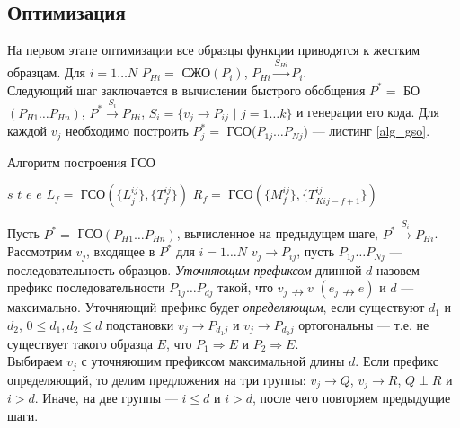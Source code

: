 \documentclass[12pt]{article}
\begin{document}
\subsection[Оптимизация]{\large Оптимизация}
\hspace{\parindent} На первом этапе оптимизации все образцы функции приводятся к жестким образцам. Для $i = 1 \ldots N$ $P_{Hi} = $ СЖО$(P_i)$, $P_{Hi} \xrightarrow{S_{Hi}} P_i$.\\
\indent Следующий шаг заключается в вычислении быстрого обобщения $P^{*} = $ БО$(P_{H1} \ldots P_{Hn})$, $P^{*} \xrightarrow{S_i} P_{Hi}$, $S_i = \{v_j \to P_{ij}$ $|$ $j = 1\ldots k \}$ и генерации его кода. Для каждой $v_j$ необходимо построить $P_j^* = $ ГСО($P_{1j} \ldots P_{Nj}$) --- листинг \ref{alg_gso}.
 
\begin{algorithm}[H]
\caption{Алгоритм построения ГСО}\label{alg_gso}
\begin{algorithmic}[1]
		\State \Return $s$
	\EndIf
		\State \Return $t$
	\EndIf
		\State {}
		\State {}
		\State {}
		\State {}		
			\State \Return $e$
		\EndIf
			\State \Return $e$
		\EndIf
		\State $L_f = $ ГСО$(\{L_j^{ij}\}, \{T_f^{ij}\})$
		\State $R_f = $ ГСО$(\{M_f^{ij}\}, \{T_{Kij-f+1}^{ij}\})$	
		\State {} 	
	\EndIf
\EndFunction
\end{algorithmic}
\end{algorithm}

\indent Пусть $P^{*} = $ ГСО$(P_{H1} \ldots P_{Hn})$, вычисленное на предыдущем шаге, $P^{*} \xrightarrow{S_i} P_{Hi}$. Рассмотрим $v_j$, входящее в $P^*$ для $i = 1 \ldots N$ $v_j \to P_{ij}$, пусть $P_{1j} \ldots P_{Nj}$ --- последовательность образцов. \textit{Уточняющим префиксом} длинной $d$ назовем префикс последовательности $P_{1j} \ldots P_{dj}$ такой, что $v_j \nrightarrow v$ $(e_j \nrightarrow e)$ и $d$ --- максимально. Уточняющий префикс будет \textit{определяющим}, если существуют $d_1$ и $d_2$, $0 \leq d_1, d_2 \leq d$ подстановки $v_j \to P_{d_1j}$ и $v_j \to P_{d_2j}$ ортогональны --- т.е. не существует такого образца $E$, что $P_1 \Rightarrow E$ и $P_2 \Rightarrow E$.\\
\indent Выбираем $v_j$ с уточняющим префиксом максимальной длины $d$. Если префикс определяющий, то делим предложения на три группы: $v_j \to Q$, $v_j \to R$, $Q \perp R$ и $i > d$. Иначе, на две группы --- $i \leq d$ и $i > d$, после чего повторяем предыдущие шаги.
\end{document}
